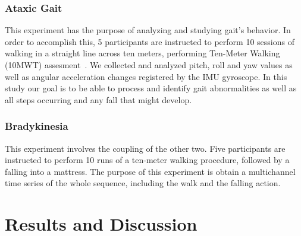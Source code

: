 \documentclass[conference]{IEEEtran}
\begin{document}
\subsubsection{Ataxic Gait}

This experiment has the purpose of analyzing and studying gait's behavior. In order to accomplish this,  5 participants are instructed to perform 10 sessions of walking in a straight line across ten meters, performing Ten-Meter Walking (10MWT) assesment~\cite{Olmos.etal2008}.  We collected and analyzed pitch, roll and yaw values as well as angular acceleration changes registered by the IMU gyroscope. In this study our goal is to be able to process and identify gait abnormalities as well as all steps occurring and any fall that might develop. 



\subsubsection{Bradykinesia}

This experiment involves the coupling of the other two.  Five participants are instructed to perform 10 runs of a ten-meter walking procedure, followed by a falling into a mattress.  The purpose of this experiment is obtain a multichannel time series of the whole sequence, including the walk and the falling action.




\section*{Results and Discussion}
\end{document}
